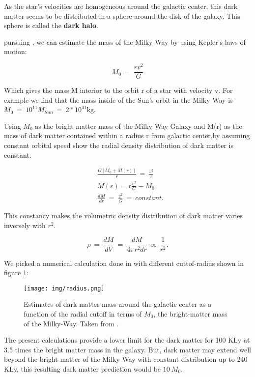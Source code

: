 \documentclass[12pt, letterpaper, twocolumn]{article}
\begin{document}
As the star's velocities are homogeneous around the galactic center, this dark matter seems to be distributed in a sphere around the disk of the galaxy. This sphere is called the \textbf{dark halo}. 

pursuing \cite{last,Piattella_2018}, we can estimate the mass of the Milky Way by using Kepler's laws of motion: 

\begin{equation}
M_0~=~\frac{rv^2}{G}
\end{equation}

Which gives the mass M interior to the orbit r of a star with velocity v. For example we find that the mass inside of the Sun's orbit in the Milky Way is $M_0~=~10^{11}M_{Sun}~=~2*10^{41}$kg. 

Using $M_0$ as the bright-matter mass of the Milky Way Galaxy and M(r) as the mass of dark matter contained within a radius r from galactic center,by assuming constant orbital speed show the radial density distribution of dark matter is constant.

\begin{align}
&\frac{G[M_0+M(r)]}{r}~=~\frac{v^2}{r}\\
&M(r)=r\frac{v^2}{G}-M_0\\
&\frac{dM}{dr}~=~\frac{v^2}{G}~=~constant.
\end{align}

This constancy makes the volumetric density distribution of dark matter varies inversely with $r^2$. 

\begin{equation}
\rho~=~\frac{dM}{dV}~=~\frac{dM}{4 \pi r^2 dr}~\propto~\frac{1}{r^2}.
\end{equation}

We picked a numerical calculation done in \cite{last} with different cuttof-radius shown in figure \ref{radius}: 

\begin{figure}[ht]
    \centering
    \texttt{[image: img/radius.png]}
    \caption{Estimates of dark matter mass around the galactic center as a function of the radial cutoff in terms of $M_0$, the bright-matter mass of the Milky-Way. Taken from \cite{last}.}
    \label{radius}
\end{figure}

The present calculations provide a lower limit for the dark matter for 100 KLy at 3.5 times the bright matter mass in the galaxy. But, dark matter may extend well beyond the bright matter of the Milky Way with constant distribution up to 240 KLy, this resulting dark matter prediction would be $10~M_0$.
\end{document}
